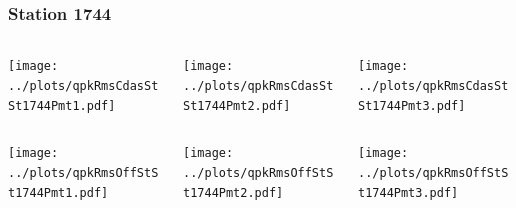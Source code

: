 \documentclass[aspectratio=169]{beamer}
\begin{document}
\begin{frame} 
  \frametitle{Station 1744}
  \begin{center}
    \begin{columns}
      \begin{column}{0.33\textwidth}
        \texttt{[image: ../plots/qpkRmsCdasStSt1744Pmt1.pdf]}
      \end{column}
      \begin{column}{0.33\textwidth}
        \texttt{[image: ../plots/qpkRmsCdasStSt1744Pmt2.pdf]}
      \end{column}
      \begin{column}{0.33\textwidth}
        \texttt{[image: ../plots/qpkRmsCdasStSt1744Pmt3.pdf]}
      \end{column}
    \end{columns}
  \end{center}

  \begin{center}
    \begin{columns}
      \begin{column}{0.33\textwidth}
        \texttt{[image: ../plots/qpkRmsOffStSt1744Pmt1.pdf]}
      \end{column}
      \begin{column}{0.33\textwidth}
        \texttt{[image: ../plots/qpkRmsOffStSt1744Pmt2.pdf]}
      \end{column}
      \begin{column}{0.33\textwidth}
        \texttt{[image: ../plots/qpkRmsOffStSt1744Pmt3.pdf]}
      \end{column}
    \end{columns}
  \end{center}
\end{frame}
\end{document}
